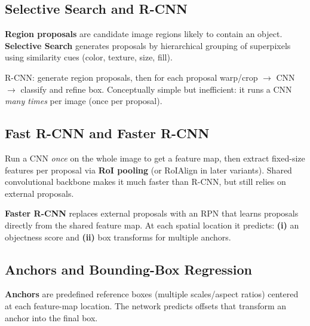 \documentclass[11pt, oneside]{book}
\begin{document}
\subsection{Selective Search and R-CNN}

\begin{defbox}[title={Region Proposals}]
\textbf{Region proposals} are candidate image regions likely to contain an object.
\textbf{Selective Search} generates proposals by hierarchical grouping of superpixels using similarity cues
(color, texture, size, fill).
\end{defbox}

R-CNN: generate region proposals, then for each proposal warp/crop $\rightarrow$ CNN $\rightarrow$ classify and refine box.
Conceptually simple but inefficient: it runs a CNN \emph{many times} per image (once per proposal).

\subsection{Fast R-CNN and Faster R-CNN}

\begin{defbox}[title={Fast R-CNN}]
Run a CNN \emph{once} on the whole image to get a feature map, then extract fixed-size features per proposal via
\textbf{RoI pooling} (or RoIAlign in later variants).
Shared convolutional backbone makes it much faster than R-CNN, but still relies on external proposals.
\end{defbox}

\begin{defbox}[title={Region Proposal Network (RPN)}]
\textbf{Faster R-CNN} replaces external proposals with an RPN that learns proposals directly from the shared feature map.
At each spatial location it predicts: \textbf{(i)} an objectness score and \textbf{(ii)} box transforms for multiple anchors.
\end{defbox}

\subsection{Anchors and Bounding-Box Regression}

\begin{defbox}[title={Anchors}]
\textbf{Anchors} are predefined reference boxes (multiple scales/aspect ratios) centered at each feature-map location.
The network predicts offsets that transform an anchor into the final box.
\end{defbox}
\end{document}

